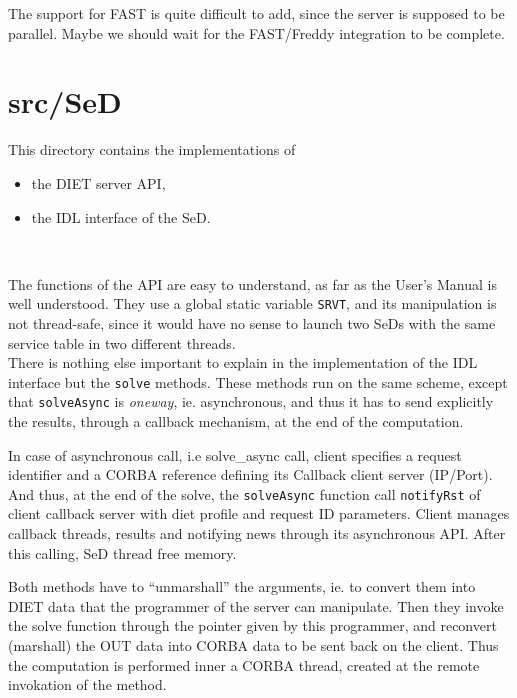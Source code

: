   The support for FAST is quite difficult to add, since the server is supposed to
  be parallel. Maybe we should wait for the FAST/Freddy integration to be
  complete.



  \section{\textsf{src/SeD}}
  \label{s:SeD}

  This directory contains the implementations of
  \begin{itemize}
  \item the DIET server API,
  \item the IDL interface of the SeD.
  \end{itemize}
  \

  The functions of the API are easy to understand, as far as the User's Manual is
  well understood. They use a global static variable \texttt{SRVT}, and its
  manipulation is not thread-safe, since it would have no sense to launch two SeDs
  with the same service table in two different threads.
  \\

  There is nothing else important to explain in the implementation of the IDL
  interface but the \texttt{solve} methods. These methods run on the same
  scheme, except that \texttt{solveAsync} is \textit{oneway}, ie. asynchronous,
  and thus it has to send explicitly the results, through a callback mechanism, at
  the end of the computation.

  In case of asynchronous call, i.e solve\_async call, client specifies a request
  identifier and a CORBA reference defining its Callback client server (IP/Port).
  And thus, at the end of the solve, the \texttt{solveAsync} function call \texttt{notifyRst}
  of client callback server with diet profile and request ID parameters. Client manages
  callback threads, results and notifying news through its asynchronous API.
  After this calling, SeD thread free memory.

  Both methods have to ``unmarshall'' the arguments, ie. to convert them into DIET
  data that the programmer of the server can manipulate. Then they invoke the
  solve function through the pointer given by this programmer, and reconvert
  (marshall) the OUT data into CORBA data to be sent back on the client. Thus the
  computation is performed inner a CORBA thread, created at the remote invokation
  of the method.

